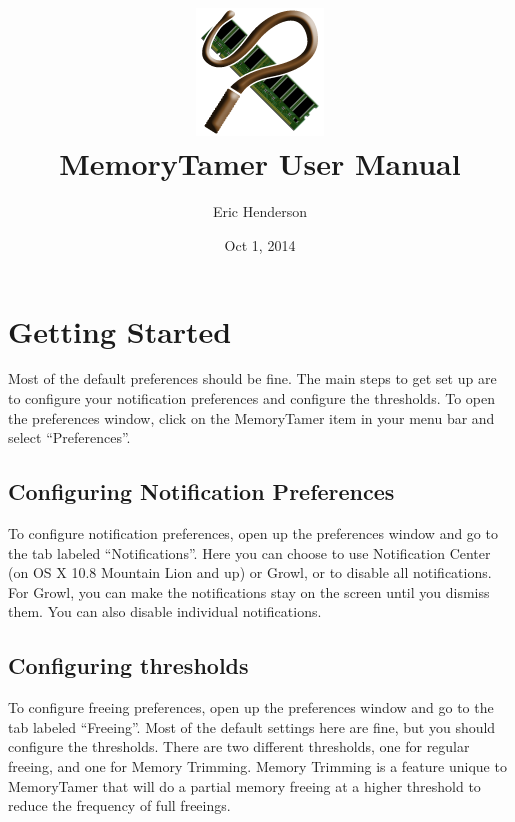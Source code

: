 \documentclass[]{article}
\begin{document}
\title{
\includegraphics[width=128px]{../resources/Icon}\\
MemoryTamer User Manual
}
\author{Eric Henderson}
\date{Oct 1, 2014}
\maketitle

\clearpage
\tableofcontents
\clearpage
\section{Getting Started}

Most of the default preferences should be fine.  The main steps to get set up are to configure your notification preferences and configure the thresholds.  To open the preferences window, click on the MemoryTamer item in your menu bar and select ``Preferences''.

\subsection{Configuring Notification Preferences}
To configure notification preferences, open up the preferences window and go to the tab labeled ``Notifications''.  Here you can choose to use Notification Center (on OS X 10.8 Mountain Lion and up) or Growl, or to disable all notifications.  For Growl, you can make the notifications stay on the screen until you dismiss them.  You can also disable individual notifications.

\subsection{Configuring thresholds}
To configure freeing preferences, open up the preferences window and go to the tab labeled ``Freeing''.  Most of the default settings here are fine, but you should configure the thresholds. There are two different thresholds, one for regular freeing, and one for Memory Trimming.  Memory Trimming is a feature unique to MemoryTamer that will do a partial memory freeing at a higher threshold to reduce the frequency of full freeings.
\end{document}
